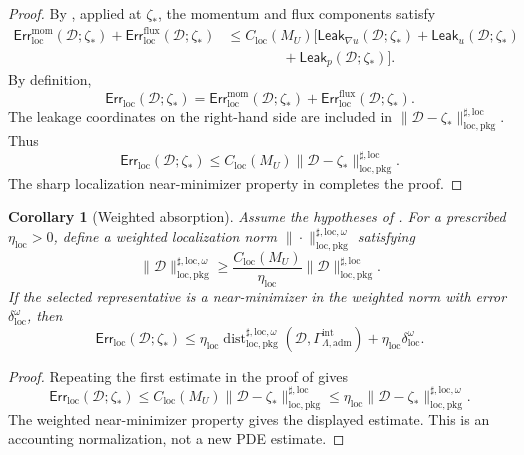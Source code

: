 \documentclass[11pt]{article}
\numberwithin{equation}{section}
\newtheorem{corollary}[corollary]{Corollary}
\theoremstyle{definition}
\theoremstyle{remark}
\newcommand{\loc}{\mathrm{loc}}
\newcommand{\pkg}{\mathrm{pkg}}
\newcommand{\adm}{\mathrm{adm}}
\newcommand{\mom}{\mathrm{mom}}
\newcommand{\flux}{\mathrm{flux}}
\newcommand{\Err}{\mathsf{Err}}
\newcommand{\Leak}{\mathsf{Leak}}
\newcommand{\Dist}{\operatorname{dist}}
\newcommand{\calD}{\mathcal D}
\newcommand{\Gadm}{\Gamma^{\mathrm{int}}_{\Lambda,\adm}}
\begin{document}
\begin{proof}
By , applied
at \(\zeta_*\), the momentum and flux components satisfy
\[
\begin{aligned}
    \Err_{\loc}^{\mom}(\calD;\zeta_*)
    +
    \Err_{\loc}^{\flux}(\calD;\zeta_*)
    &\le
    C_{\loc}(M_U)
    \bigl[
        \Leak_{\nabla u}(\calD;\zeta_*)
        +
        \Leak_u(\calD;\zeta_*) \\
    &\qquad\qquad+
        \Leak_p(\calD;\zeta_*)
    \bigr].
\end{aligned}
\]
By definition,
\[
    \Err_{\loc}(\calD;\zeta_*)
    =
    \Err_{\loc}^{\mom}(\calD;\zeta_*)
    +
    \Err_{\loc}^{\flux}(\calD;\zeta_*).
\]
The leakage coordinates on the right-hand side are included in
\(\|\calD-\zeta_*\|_{\loc,\pkg}^{\sharp,\loc}\).  Thus
\[
    \Err_{\loc}(\calD;\zeta_*)
    \le
    C_{\loc}(M_U)
    \|\calD-\zeta_*\|_{\loc,\pkg}^{\sharp,\loc}.
\]
The sharp localization near-minimizer property in
 completes the proof.
\end{proof}

\begin{corollary}[Weighted absorption]
\label{loc:thm:weighted-localization-absorption}
Assume the hypotheses of
.
For a prescribed \(\eta_{\loc}>0\), define a weighted localization norm
\(\|\cdot\|_{\loc,\pkg}^{\sharp,\loc,\omega}\) satisfying
\[
    \|\calD\|_{\loc,\pkg}^{\sharp,\loc,\omega}
    \ge
    \frac{C_{\loc}(M_U)}{\eta_{\loc}}
    \|\calD\|_{\loc,\pkg}^{\sharp,\loc}.
\]
If the selected representative is a near-minimizer in the weighted norm with
error \(\delta_{\loc}^{\omega}\), then
\[
    \Err_{\loc}(\calD;\zeta_*)
    \le
    \eta_{\loc}
    \Dist_{\loc,\pkg}^{\sharp,\loc,\omega}(\calD,\Gadm)
    +
    \eta_{\loc}\delta_{\loc}^{\omega}.
\]
\end{corollary}

\begin{proof}
Repeating the first estimate in the proof of
 gives
\[
    \Err_{\loc}(\calD;\zeta_*)
    \le
    C_{\loc}(M_U)
    \|\calD-\zeta_*\|_{\loc,\pkg}^{\sharp,\loc}
    \le
    \eta_{\loc}
    \|\calD-\zeta_*\|_{\loc,\pkg}^{\sharp,\loc,\omega}.
\]
The weighted near-minimizer property gives the displayed estimate.  This is an
accounting normalization, not a new PDE estimate.
\end{proof}
\end{document}
